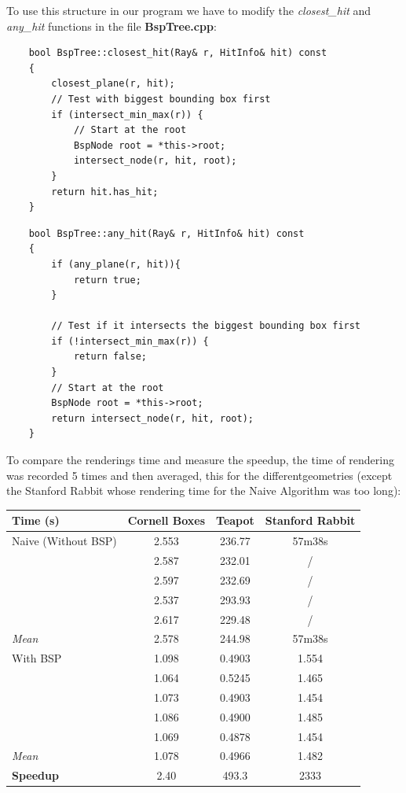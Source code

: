\documentclass[a4,12pt]{article}
\begin{document}
	To use this structure in our program we have to modify the \textit{closest\_hit} and \textit{any\_hit} functions in the file \textbf{BspTree.cpp}:\\
	
	\begin{lstlisting}
	bool BspTree::closest_hit(Ray& r, HitInfo& hit) const
	{
		closest_plane(r, hit);
		// Test with biggest bounding box first
		if (intersect_min_max(r)) {
			// Start at the root
			BspNode root = *this->root;
			intersect_node(r, hit, root);
		}
		return hit.has_hit;
	}
	\end{lstlisting}
	
	\begin{lstlisting}
	bool BspTree::any_hit(Ray& r, HitInfo& hit) const
	{
		if (any_plane(r, hit)){
			return true;
		}
		    
		// Test if it intersects the biggest bounding box first
		if (!intersect_min_max(r)) {
			return false;
		}
		// Start at the root
		BspNode root = *this->root;
		return intersect_node(r, hit, root);
	}
	\end{lstlisting}
	
	To compare the renderings time and measure the speedup, the time of rendering was recorded 5 times and then averaged, this for the differentgeometries (except the Stanford Rabbit whose rendering time for the Naive Algorithm was too long):\\
	
	\begin{tabular}{|l|c|c|c|}
		\hline
		\textbf{Time (s)} & \textbf{Cornell Boxes} & \textbf{Teapot} & \textbf{Stanford Rabbit}\\ \hline \hline
		Naive (Without BSP) & 2.553 & 236.77 &57m38s\\ \hline
		& 2.587 & 232.01 &/\\ \hline
		& 2.597 & 232.69 &/\\ \hline
		& 2.537 & 293.93 &/\\ \hline
		& 2.617 & 229.48 &/\\ \hline
		\textit{Mean} & 2.578 & 244.98 &57m38s\\ \hline \hline
		With BSP & 1.098 & 0.4903 & 1.554\\ \hline
		& 1.064 & 0.5245 & 1.465\\ \hline
		& 1.073 & 0.4903 & 1.454\\ \hline
		& 1.086 & 0.4900 & 1.485\\ \hline
		& 1.069 & 0.4878 & 1.454\\ \hline
		\textit{Mean} & 1.078 & 0.4966 & 1.482\\ \hline \hline
		\textbf{Speedup} & 2.40 & 493.3 &2333\\ \hline
	\end{tabular}
	\vspace{1em}
	
\end{document}
